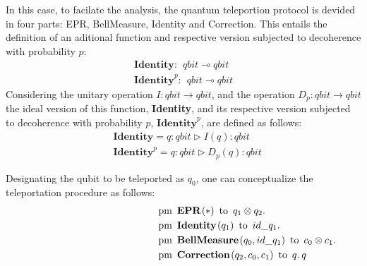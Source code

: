 In this case, to facilate the analysis, the quantum teleportion protocol is devided in four parts: EPR, BellMeasure, Identity and Correction. This entails the definition of an aditional function and respective version subjected to decoherence with probability $p$:
\begin{equation*}
  \begin{split}
  \textbf{Identity}: \hspace{5pt} \textit{qbit}  \multimap \textit{qbit} \\
  \textbf{Identity}^{p}: \hspace{5pt} \textit{qbit}  \multimap \textit{qbit}
  \end{split}
\end{equation*}
Considering the unitary operation $I: \textit{qbit} \xrightarrow{} \textit{qbit}$, and the operation $D_{p}: \textit{qbit} \xrightarrow{}  \textit{qbit}$  the ideal version of this function, \textbf{Identity}, and its respective version subjected to decoherence with probability $p$, $\textbf{Identity}^{p}$,  are defined as follows:
\begin{align}
  &\textbf{Identity} =  q: \textit{qbit}  \triangleright  I (q) :  \textit{qbit} \\
  &\textbf{Identity}^{p} =  q: \textit{qbit}  \triangleright  D_{p} (q) : \textit{qbit}
\end{align}

Designating the qubit to be teleported as $q_0$, one can conceptualize the teleportation procedure as follows:
\begin{align*}
    \hspace{130 pt}& \text{pm} \hspace{5pt} \textbf{EPR}\hspace{1pt} (*) \hspace{5pt} \text{to} \hspace{5pt}  q_{1} \otimes q_{2}.  \notag \\
    & \text{pm}\hspace{5pt} \textbf{Identity} \hspace{1pt} (q_{1}) \hspace{5pt}  \text{to} \hspace{5pt} id\_q_{1}. \notag \\
    & \text{pm}\hspace{5pt} \textbf{BellMeasure} \hspace{1pt} (q_0,id\_q_{1}) \hspace{5pt}  \text{to} \hspace{5pt} c_{0}\otimes c_{1} . \notag \\
    & \text{pm} \hspace{5pt}  \textbf{Correction} \hspace{1pt} ( q_{2},  c_{0}, c_{1} ) \hspace{5pt} \text{to} \hspace{5pt}  q. \hspace{2pt}  q
\end{align*}

